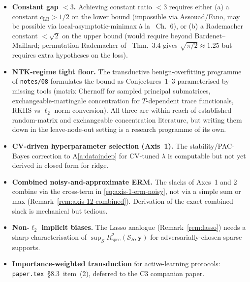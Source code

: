 \documentclass[11pt,a4paper]{article}
\theoremstyle{plain}
\theoremstyle{definition}
\theoremstyle{remark}
\newcommand{\by}{\mathbf{y}}
\newcommand{\Rspec}{R^2_{\mathrm{spec}}}
\newcommand{\Scal}{\mathcal{S}}
\begin{document}
\begin{itemize}[label=$\bullet$,leftmargin=*]
\item \textbf{Constant gap $< 3$.} Achieving constant
    ratio $< 3$ requires either (a) a constant
    $c_{\mathrm{LB}} > 1/2$ on the lower bound (impossible via
    Assouad/Fano, may be possible via local-asymptotic-minimax
    \`a la \citet{LeCam1986}~Ch.~6), or (b) a Rademacher constant
    $< \sqrt 2$ on the upper bound (would require beyond
    Bardenet--Maillard; permutation-Rademacher of
    \citet{Pechyony2008phd}~Thm.~3.4 gives $\sqrt{\pi/2} \approx 1.25$
    but requires extra hypotheses on the loss).
\item \textbf{NTK-regime tight floor.} The transductive
    benign-overfitting programme of \texttt{notes/08} formulates
    the bound as Conjectures~1--3 parameterised by missing tools
    (matrix Chernoff for sampled principal submatrices,
    exchangeable-martingale concentration for $T$-dependent
    trace functionals, RKHS-vs-$\ell_2$ norm conversion). All three
    are within reach of established random-matrix and exchangeable
    concentration literature, but writing them down in the
    leave-node-out setting is a research programme of its own.
\item \textbf{CV-driven hyperparameter selection (Axis~1).} The
    stability/PAC-Bayes correction to A\ref{a:dataindep} for
    CV-tuned $\lambda$ is computable but not yet derived in
    closed form for ridge.
\item \textbf{Combined noisy-and-approximate ERM.} The slacks of
    Axes~1 and 2 combine via the cross-term in
    \eqref{eq:axis-1-erm-noisy}, not via a simple sum or max
    (Remark~\ref{rem:axis-12-combined}). Derivation of the exact
    combined slack is mechanical but tedious.
\item \textbf{Non-$\ell_2$ implicit biases.} The Lasso analogue
    (Remark~\ref{rem:lasso}) needs a sharp characterisation of
    $\sup_S \Rspec(\Scal_S, \by)$ for adversarially-chosen sparse
    supports.
\item \textbf{Importance-weighted transduction} for active-learning
    protocols: \texttt{paper.tex}~\S8.3~item~(2), deferred to the
    C3 companion paper.
\end{itemize}


\end{document}
